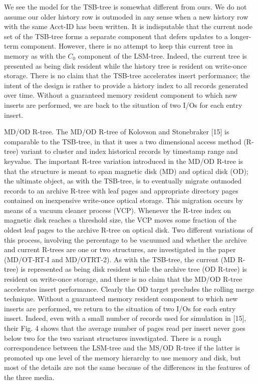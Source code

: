 \documentclass[a4paper,12pt,notitlepage,twoside,openright]{article}
\begin{document}
We see the model for the TSB-tree is somewhat different from ours. We do
not assume our older history row is outmoded in any sense when a new
history row with the same Acct-ID has been written. It is indisputable
that the current node set of the TSB-tree forms a separate component
that defers updates to a longer-term component. However, there is no
attempt to keep this current tree in memory as with the \(C_0\) component of
the LSM-tree. Indeed, the current tree is presented as being disk
resident while the history tree is resident on write-once storage. There
is no claim that the TSB-tree accelerates insert performance; the intent
of the design is rather to provide a history index to all records
generated over time. Without a guaranteed memory resident component to
which new inserts are performed, we are back to the situation of two
I/Os for each entry insert.

MD/OD R-tree. The MD/OD R-tree of Kolovson and Stonebraker {[}15{]} is
comparable to the TSB-tree, in that it uses a two dimensional access
method (R-tree) variant to cluster and index historical records by
timestamp range and keyvalue. The important R-tree variation introduced
in the MD/OD R-tree is that the structure is meant to span magnetic disk
(MD) and optical disk (OD); the ultimate object, as with the TSB-tree,
is to eventually migrate outmoded records to an archive R-tree with leaf
pages and appropriate directory pages contained on inexpensive
write-once optical storage. This migration occurs by means of a vacuum
cleaner process (VCP). Whenever the R-tree index on magnetic disk
reaches a threshold size, the VCP moves some fraction of the oldest leaf
pages to the archive R-tree on optical disk. Two different variations of
this process, involving the percentage to be vacuumed and whether the
archive and current R-trees are one or two structures, are investigated
in the paper (MD/OT-RT-I and MD/OTRT-2). As with the TSB-tree, the
current (MD R-tree) is represented as being disk resident while the
archive tree (OD R-tree) is resident on write-once storage, and there is
no claim that the MD/OD R-tree accelerates insert performance. Clearly
the OD target precludes the rolling merge technique. Without a
guaranteed memory resident component to which new inserts are performed,
we return to the situation of two I/Os for each entry insert. Indeed,
even with a small number of records used for simulation in {[}15{]},
their Fig. 4 shows that the average number of pages read per insert
never goes below two for the two variant structures investigated. There
is a rough correspondence between the LSM-tree and the MS/OD R-tree if
the latter is promoted up one level of the memory hierarchy to use
memory and disk, but most of the details are not the same because of the
differences in the features of the three media.
\end{document}
